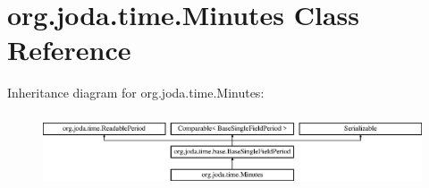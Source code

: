 \hypertarget{classorg_1_1joda_1_1time_1_1_minutes}{\section{org.\-joda.\-time.\-Minutes Class Reference}
\label{classorg_1_1joda_1_1time_1_1_minutes}
}
Inheritance diagram for org.\-joda.\-time.\-Minutes\-:\begin{figure}[H]
\begin{center}
\leavevmode
\includegraphics[height=2.187500cm]{classorg_1_1joda_1_1time_1_1_minutes}
\end{center}
\end{figure}

